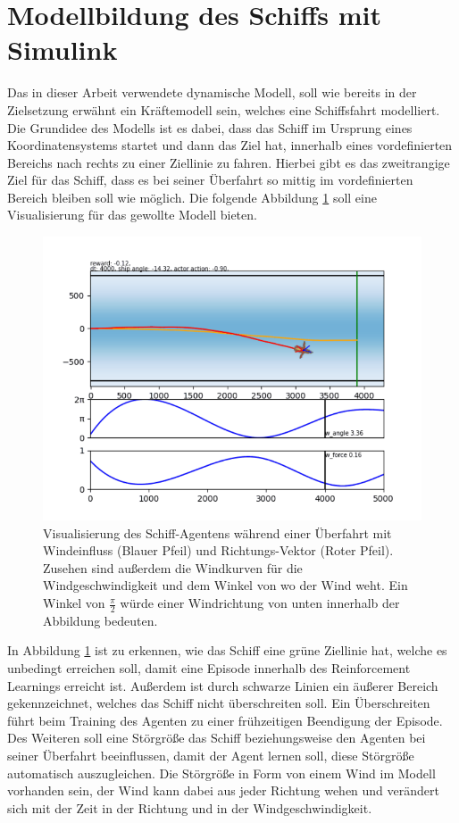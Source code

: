 \documentclass[]{iat}
\begin{document}
\section{Modellbildung des Schiffs mit Simulink} \label{sec:imp_simulink}
Das in dieser Arbeit verwendete dynamische Modell, soll wie bereits in der Zielsetzung erwähnt ein Kräftemodell sein, welches eine Schiffsfahrt modelliert. Die Grundidee des Modells ist es dabei, dass das Schiff im Ursprung eines Koordinatensystems startet und dann das Ziel hat, innerhalb eines vordefinierten Bereichs nach rechts zu einer Ziellinie zu fahren. Hierbei gibt es das zweitrangige Ziel für das Schiff, dass es bei seiner Überfahrt so mittig im vordefinierten Bereich bleiben soll wie möglich. Die folgende Abbildung \ref*{abb:boat_frame_example_2} soll eine Visualisierung für das gewollte Modell bieten.
\begin{figure}[H]
    \includegraphics[width=\textwidth]{graphics/boat_frame_example_2.png}
    \centering
    \caption{Visualisierung des Schiff-Agentens während einer Überfahrt mit Windeinfluss (Blauer Pfeil) und Richtungs-Vektor (Roter Pfeil). Zusehen sind außerdem die Windkurven für die Windgeschwindigkeit und dem Winkel von wo der Wind weht. Ein Winkel von $\frac{\pi}{2}$ würde einer Windrichtung von unten innerhalb der Abbildung bedeuten.}
    \label{abb:boat_frame_example_2}
\end{figure}
In Abbildung \ref*{abb:boat_frame_example_2} ist zu erkennen, wie das Schiff eine grüne Ziellinie hat, welche es unbedingt erreichen soll, damit eine Episode innerhalb des Reinforcement Learnings erreicht ist. Außerdem ist durch schwarze Linien ein äußerer Bereich gekennzeichnet, welches das Schiff nicht überschreiten soll. Ein Überschreiten führt beim Training des Agenten zu einer frühzeitigen Beendigung der Episode. Des Weiteren soll eine Störgröße das Schiff beziehungsweise den Agenten bei seiner Überfahrt beeinflussen, damit der Agent lernen soll, diese Störgröße automatisch auszugleichen. Die Störgröße in Form von einem Wind im Modell vorhanden sein, der Wind kann dabei aus jeder Richtung wehen und verändert sich mit der Zeit in der Richtung und in der Windgeschwindigkeit.\\
\end{document}
